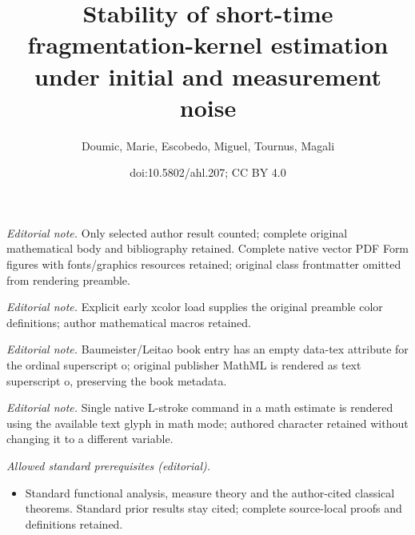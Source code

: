\documentclass[10pt]{amsart}
\title{Stability of short-time fragmentation-kernel estimation under initial and measurement noise}
\author{Doumic, Marie, Escobedo, Miguel, Tournus, Magali}
\date{doi:10.5802/ahl.207; CC BY 4.0}
\theoremstyle{definition}\newtheorem{defi}[theo]{Definition}\newtheorem{rema}[theo]{Remark}\newtheorem{exam}[theo]{Example}\newtheorem{exem}[theo]{Example}\newtheorem{nota}[theo]{Notation}
\begin{document}
\maketitle
\noindent\textit{Editorial note.} Only selected author result counted; complete original mathematical body and bibliography retained. Complete native vector PDF Form figures with fonts/graphics resources retained; original class frontmatter omitted from rendering preamble.\par\medskip
\noindent\textit{Editorial note.} Explicit early xcolor load supplies the original preamble color definitions; author mathematical macros retained.\par\medskip
\noindent\textit{Editorial note.} Baumeister/Leitao book entry has an empty data-tex attribute for the ordinal superscript o; original publisher MathML is rendered as text superscript o, preserving the book metadata.\par\medskip
\noindent\textit{Editorial note.} Single native L-stroke command in a math estimate is rendered using the available text glyph in math mode; authored character retained without changing it to a different variable.\par\medskip
\noindent\textit{Allowed standard prerequisites (editorial).}\begin{itemize}
\item Standard functional analysis, measure theory and the author-cited classical theorems. Standard prior results stay cited; complete source-local proofs and definitions retained.
\end{itemize}\medskip
\end{document}

